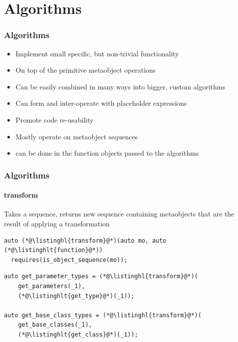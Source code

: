\documentclass[compress,table,xcolor=table]{beamer}
\begin{document}
\section{Algorithms}
\begin{frame}
  \frametitle{Algorithms}
  \larger
  \begin{itemize}
    \item Implement small specific, but non-trivial functionality
    \item On top of the primitive metaobject operations
    \item Can be easily combined in many ways into bigger, custom algorithms
    \item Can form and inter-operate with placeholder expressions
    \item Promote code re-usability
    \item Mostly operate on metaobject sequences
    \item {} can be done in the function objects passed
      to the algorithms
  \end{itemize}
\end{frame}
\begin{frame}[fragile]
  \frametitle{Algorithms}
  \framesubtitle{transform}
  Takes a sequence, returns new sequence containing metaobjects that are
  the result of applying a transformation 
  \begin{lstlisting}[language=c++2x]
auto (*@\listinghl{transform}@*)(auto mo, auto (*@\listinghlt{function}@*))
  requires(is_object_sequence(mo));
  \end{lstlisting}
  \vfill
  \begin{lstlisting}[language=c++2x,basicstyle=\footnotesize\ttfamily]
auto get_parameter_types = (*@\listinghl{transform}@*)(
    get_parameters(_1),
    (*@\listinghlt{get_type}@*)(_1));

auto get_base_class_types = (*@\listinghl{transform}@*)(
    get_base_classes(_1),
    (*@\listinghlt{get_class}@*)(_1));
  \end{lstlisting}
\end{frame}
\end{document}

